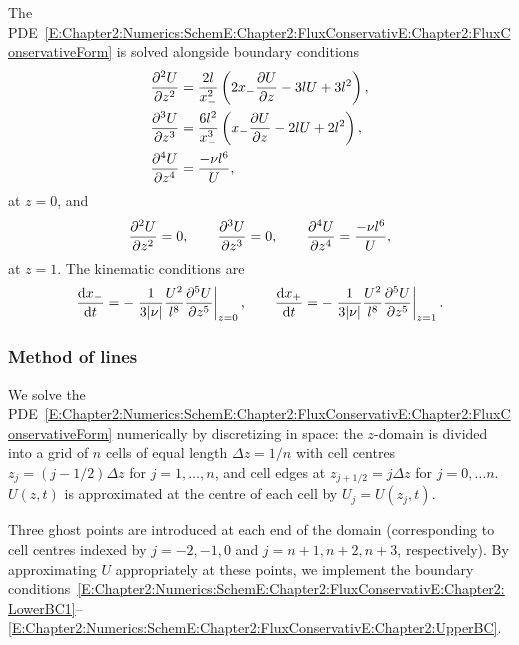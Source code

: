 The PDE~\eqref{E:Chapter2:Numerics:SchemE:Chapter2:FluxConservativE:Chapter2:FluxConservativeForm} is solved alongside boundary conditions
\begin{align}
\frac{\partial ^2 U}{\partial z^2} &= \frac{2l}{x_{-}^2}\left(2x_{-} \frac{\partial U}{\partial z} - 3lU + 3l^2\right),\label{E:Chapter2:Numerics:SchemE:Chapter2:FluxConservativE:Chapter2:LowerBC1} \\
\frac{\partial ^3 U}{\partial z^3} &= \frac{6l^2}{x_{-}^3}\left(x_{-} \frac{\partial U}{\partial z} - 2lU + 2l^2\right), \label{E:Chapter2:Numerics:SchemE:Chapter2:FluxConservativE:Chapter2:LowerBC2} \\
 \frac{\partial ^4 U}{\partial z^4} &= \frac{-\nu l^6}{U},\label{E:Chapter2:Numerics:SchemE:Chapter2:FluxConservativE:Chapter2:LowerBC3}
\end{align}
at $z = 0$, and
\begin{equation}\label{E:Chapter2:Numerics:SchemE:Chapter2:FluxConservativE:Chapter2:UpperBC}
\frac{\partial ^2 U}{\partial z^2} = 0,\qquad \frac{\partial ^3 U}{\partial z^3} = 0, \qquad   \frac{\partial ^4 U}{\partial z^4} = \frac{-\nu l^6}{U},
\end{equation}
at $z = 1$. The kinematic conditions are
\begin{equation}\label{E:Chapter2:Numerics:SchemE:Chapter2:FluxConservativE:Chapter2:Kinematic}
\frac{\mathrm{d} x_{-}}{\mathrm{d} t} = -\left.\frac{1}{3|\nu|}\frac{U^2}{l^8}\frac{\partial ^5 U}{\partial z^5}\right|_{z = 0}, \qquad \frac{\mathrm{d} x_{+}}{\mathrm{d} t} = -\left.\frac{1}{3|\nu|}\frac{U^2}{l^8}\frac{\partial ^5 U}{\partial z^5}\right|_{z = 1}.
\end{equation}
\subsubsection{Method of lines}

We solve the PDE~\eqref{E:Chapter2:Numerics:SchemE:Chapter2:FluxConservativE:Chapter2:FluxConservativeForm} numerically by discretizing in space: the $z$-domain is divided into a grid of $n$ cells of equal length $\Delta z = 1/n$ with cell centres $z_j = (j - 1/2)\Delta z$ for $j = 1,\dots, n$, and cell edges at $z_{j+1/2} = j\Delta z$ for $j = 0, \dots n$. $U(z,t)$ is approximated at the centre of each cell by $U_j = U(z_j, t)$.

Three ghost points are introduced at each end of the domain (corresponding to cell centres indexed by $j = -2, -1, 0$ and $j = n+1, n+2, n+3$, respectively). By approximating $U$ appropriately at these points, we implement the boundary conditions~\eqref{E:Chapter2:Numerics:SchemE:Chapter2:FluxConservativE:Chapter2:LowerBC1}--\eqref{E:Chapter2:Numerics:SchemE:Chapter2:FluxConservativE:Chapter2:UpperBC}.

